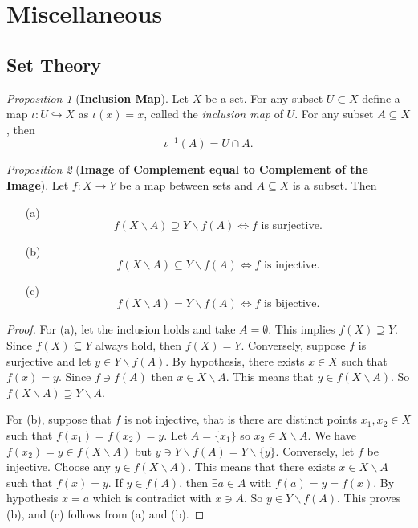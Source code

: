 \documentclass[a4paper]{article}
\theoremstyle{remark}
\newtheorem{prop}{Proposition}
\newcommand{\subhim}{\subseteq} %
\begin{document}
\section{Miscellaneous}

\subsection*{Set Theory}

\begin{prop}[\textbf{Inclusion Map}]
	Let $X$ be a set. For any subset $U \subset X$ define a map $\iota : U \hookrightarrow X$ as $\iota(x) = x$, called the \textit{inclusion map} of $U$. For any subset $A \subhim X$, then
	$$
	\iota^{-1}(A) = U \cap A.
	$$ 
\end{prop}

\begin{prop}[\textbf{Image of Complement equal to Complement of the Image}]
	Let $f : X \to Y$ be a map between sets and $A \subhim X$ is a subset. Then 
	\begin{enumerate}[nolistsep]
		\item[(a)]	$$
		f(X \smallsetminus A) \supseteq Y \smallsetminus f(A) \Leftrightarrow f \text{ is surjective}.$$
		\item[(b)] $$
		f(X \smallsetminus A) \subhim Y \smallsetminus f(A) \Leftrightarrow f \text{ is injective}.$$
		\item[(c)] $$
		f(X\smallsetminus A) = Y \smallsetminus f(A) \Leftrightarrow f \text{ is bijective}.
		$$ 
	\end{enumerate}
\end{prop}
\begin{proof}
	For (a), let the inclusion holds and take $A = \emptyset$. This implies $f(X) \supseteq Y$. Since $f(X) \subhim Y$ always hold, then $f(X) = Y$. Conversely, suppose $f$ is surjective and let $y \in Y \smallsetminus f(A)$. By hypothesis, there exists $x \in X$ such that $f(x) = y$. Since $f \ni f(A)$ then $x \in X \smallsetminus A$. This means that $y \in f(X \smallsetminus A)$. So $f(X \smallsetminus A) \supseteq Y \smallsetminus A$. 
	
	For (b), suppose that $f$ is not injective, that is there are distinct points $x_1,x_2 \in X$ such that $f(x_1)=f(x_2)=y$. Let $A = \{x_1\}$ so $x_2 \in X \smallsetminus A$. We have $f(x_2)=y \in f(X\smallsetminus A)$ but $y \ni Y \smallsetminus f(A) = Y \smallsetminus \{y\}$. Conversely, let $f$ be injective. Choose any $y \in f(X\smallsetminus A)$. This means that there exists $x \in X \smallsetminus A$ such that $f(x) = y$. If $y \in f(A)$, then $\exists a \in A$ with $f(a) = y=f(x)$. By hypothesis $x = a$ which is contradict with $x \ni A$. So $y \in Y \smallsetminus f(A)$. This proves (b), and (c) follows from (a) and (b). 
\end{proof}
\end{document}
